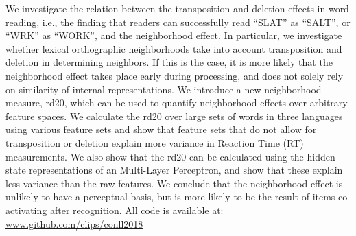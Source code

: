 We investigate the relation between the transposition and deletion effects in word reading, i.e., the finding that readers can successfully read ``SLAT'' as ``SALT'', or ``WRK'' as ``WORK'', and the neighborhood effect. In particular, we investigate whether lexical orthographic neighborhoods take into account transposition and deletion in determining neighbors. If this is the case, it is more likely that the neighborhood effect takes place early during processing, and does not solely rely on similarity of internal representations. We introduce a new neighborhood measure, rd20, which can be used to quantify neighborhood effects over arbitrary feature spaces. We calculate the rd20 over large sets of words in three languages using various feature sets and show that feature sets that do not allow for transposition or deletion explain more variance in Reaction Time (RT) measurements. We also show that the rd20 can be calculated using the hidden state representations of an Multi-Layer Perceptron, and show that these explain less variance than the raw features. We conclude that the neighborhood effect is unlikely to have a perceptual basis, but is more likely to be the result of items co-activating after recognition. All code is available at: \url{www.github.com/clips/conll2018}
